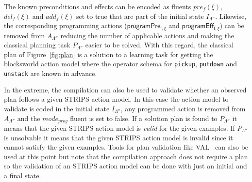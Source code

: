 \documentclass[letterpaper]{article} %
\begin{document}
The known preconditions and effects can be encoded as fluents $pre_f(\xi)$, $del_f(\xi)$ and $add_f(\xi)$ set to true that are part of the initial state $I_{\Lambda''}$. Likewise, the corresponding programming actions ($\mathsf{programPre_{f,\xi}}$ and $\mathsf{programEff_{f,\xi}}$) can be removed from $A_{\Lambda''}$ reducing the number of applicable actions  and making the classical planning task $P_{\Lambda''}$ easier to be solved. With this regard, the classical plan of Figure~\ref{fig:plan} is a solution to a learning task for getting the blocksworld action model where the operator schema for {\tt\small pickup}, {\tt\small putdown} and {\tt\small unstack} are known in advance. 

In the extreme, the compilation can also be used to validate whether an observed plan follows a given STRIPS action model. In this case the action model to validate is coded in the initial state $I_{\Lambda''}$, any programmed action is removed from $A_{\Lambda''}$ and the $mode_{prog}$ fluent is set to false. If a solution plan is found to $P_{\Lambda''}$ it means that the given STRIPS action model is {\em valid} for the given examples. If $P_{\Lambda''}$ is unsolvable it means that the given STRIPS action model is invalid since it cannot satisfy the given examples. Tools for plan validation like VAL~\cite{howey2004val} can also be used at this point but note that the compilation approach does not require a plan so the validation of an STRIPS action model can be done with just an initial and a final state.
\end{document}
